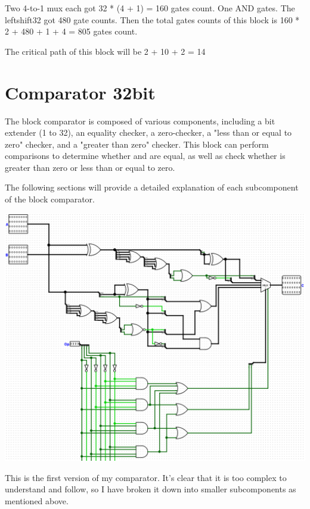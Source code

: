 \documentclass{article}
\begin{document}
\hspace{2em}Two 4-to-1 mux each got 32 * (4 + 1) = 160 gates count. One AND gates. The leftshift32 got 480 gate counts. Then the total gates counts of this block is 160 * 2 + 480 + 1 + 4 = 805 gates count.

\hspace{2em}The critical path of this block will be 2 + 10 + 2 = 14

\section{Comparator 32bit}
\hspace*{2em}The block comparator is composed of various components, including a bit extender (1 to 32), an equality checker, a zero-checker, a "less than or equal to zero" checker, and a "greater than zero" checker. This block can perform comparisons to determine whether  and  are equal, as well as check whether  is greater than zero or less than or equal to zero.

The following sections will provide a detailed explanation of each subcomponent of the block comparator.
\begin{center}
    \includegraphics[width=1\textwidth]{images/Comparator32.png}
\end{center}

\hspace*{2em}This is the first version of my comparator. It's clear that it is too complex to understand and follow, so I have broken it down into smaller subcomponents as mentioned above.
\end{document}

